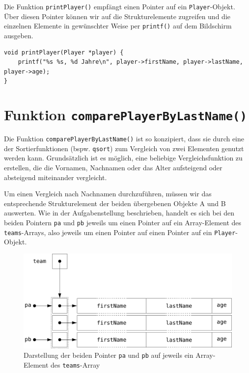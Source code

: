 Die Funktion \texttt{printPlayer()} empfängt einen Pointer auf ein
\texttt{Player}-Objekt. Über diesen Pointer können wir auf die
Strukturelemente zugreifen und die einzelnen Elemente in gewünschter Weise per
\texttt{printf()} auf dem Bildschirm ausgeben.

\begin{verbatim}
void printPlayer(Player *player) {
    printf("%s %s, %d Jahre\n", player->firstName, player->lastName, player->age);
}
\end{verbatim}

\section*{Funktion \texttt{comparePlayerByLastName()}}

Die Funktion \texttt{comparePlayerByLastName()} ist so konzipiert, dass
sie durch eine der Sortierfunktionen (bspw. \texttt{qsort}) zum Vergleich
von zwei Elementen genutzt werden kann. Grundsätzlich ist es möglich, eine
beliebige Vergleichsfunktion zu erstellen, die die Vornamen, Nachnamen oder das
Alter aufsteigend oder absteigend miteinander vergleicht.

Um einen Vergleich nach Nachnamen durchzuführen, müssen wir das entsprechende
Strukturelement der beiden übergebenen Objekte A und B auswerten. Wie in der
Aufgabenstellung beschrieben, handelt es sich bei den beiden Pointern
\texttt{pa} und \texttt{pb} jeweils um einen Pointer auf ein
Array-Element des \texttt{teams}-Arrays, also jeweils um einen Pointer
auf einen Pointer auf ein \texttt{Player}-Objekt.

\begin{figure}[htb!]
    \centering
    \includegraphics[scale=0.7]{images/sortPlayersCompareExample.pdf}
    \caption{Darstellung der beiden Pointer \texttt{pa} und
    \texttt{pb} auf jeweils ein Array-Element des
    \texttt{teams}-Array}
    \label{fig:sortPlayerCompareExample}
\end{figure}

